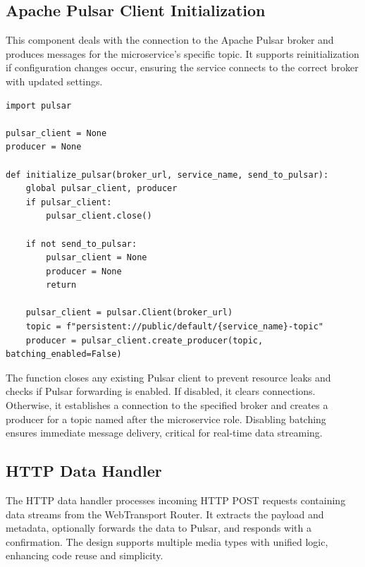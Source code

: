 \subsection{Apache Pulsar Client Initialization}
This component deals with the connection to the Apache Pulsar broker and produces messages for the microservice’s specific topic. It supports reinitialization if configuration changes occur, ensuring the service connects to the correct broker with updated settings.

\begin{lstlisting}[breaklines=true,basicstyle=\small\ttfamily,frame=single]
import pulsar

pulsar_client = None
producer = None

def initialize_pulsar(broker_url, service_name, send_to_pulsar):
    global pulsar_client, producer
    if pulsar_client:
        pulsar_client.close()

    if not send_to_pulsar:
        pulsar_client = None
        producer = None
        return

    pulsar_client = pulsar.Client(broker_url)
    topic = f"persistent://public/default/{service_name}-topic"
    producer = pulsar_client.create_producer(topic, batching_enabled=False)
\end{lstlisting}

The function closes any existing Pulsar client to prevent resource leaks and checks if Pulsar forwarding is enabled. If disabled, it clears connections. Otherwise, it establishes a connection to the specified broker and creates a producer for a topic named after the microservice role. Disabling batching ensures immediate message delivery, critical for real-time data streaming.

\subsection{HTTP Data Handler}
The HTTP data handler processes incoming HTTP POST requests containing data streams from the WebTransport Router. It extracts the payload and metadata, optionally forwards the data to Pulsar, and responds with a confirmation. The design supports multiple media types with unified logic, enhancing code reuse and simplicity.

